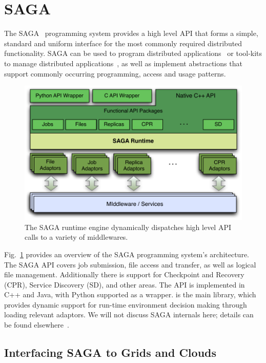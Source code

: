 \documentclass[3p,twocolumn]{elsarticle}
\begin{document}
\section{SAGA}
\label{sec:saga}

The SAGA~\cite{saga-core, Kaiser:2006qp} programming system provides a
high level API that forms a simple, standard and uniform interface for
the most commonly required distributed functionality.  SAGA can be
used to program distributed applications~\cite{saga_escience07,
saga_tg08} or tool-kits to manage distributed
applications~\cite{Luckow:2008xy}, as well as implement abstractions
that support commonly occurring programming, access and usage
patterns.

\begin{figure}[t]
 \includegraphics[scale=0.5]{saga-figure02.pdf}
 \caption{The SAGA runtime engine dynamically dispatches high level
          API calls to a variety of middlewares.}
 \label{fig:saga}
\end{figure}

Fig.~\ref{fig:saga} provides an overview of the SAGA programming
system's architecture.  The SAGA API covers job submission, file
access and transfer, as well as logical file management.  Additionally
there is support for Checkpoint and Recovery (CPR), Service Discovery
(SD), and other areas.  The API is implemented in C++ and Java, with
Python supported as a wrapper.  is the main library,
which provides dynamic support for run-time environment decision
making through loading relevant adaptors. We will not discuss SAGA
internals here; details can be found elsewhere~\cite{saga_url,Kaiser:2006qp}.


\subsection{Interfacing SAGA to Grids and Clouds}
\end{document}
